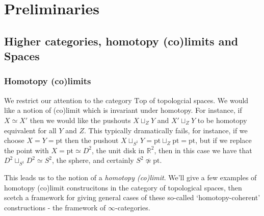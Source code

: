 \newpage
\section{Preliminaries}
\subsection{Higher categories, homotopy (co)limits and Spaces}\label{sec:infinity-categories}

\subsubsection{Homotopy (co)limits}
We restrict our attention to the category $\text{Top}$ of topologcial spaces. We would like a notion of (co)limit which is invariant under homotopy. For instance, if $X \simeq X'$ then we would like the pushouts $X \sqcup_Z Y$ and $X' \sqcup_Z Y$ to be homotopy equivalent for all $Y$ and $Z$. This typically dramatically fails, for instance, if we choose $X = Y = \text{pt}$ then the pushout $X \sqcup_{S^1} Y = \text{pt} \sqcup_Z \text{pt} = \text{pt}$, but if we replace the point with $X = \text{pt} \simeq D^2$, the unit disk in $\mathbb{R}^2$, then in this case we have that $D^2 \sqcup_{S^1} D^2 \simeq S^2$, the sphere, and certainly $S^2 \not\simeq \text{pt}$.

This leads us to the notion of a \textit{homotopy (co)limit}. We'll give a few examples of homotopy (co)limit construcitons in the category of topological spaces, then scetch a framework for giving general cases of these so-called `homotopy-coherent' constructions - the framework of $\infty$-categories.

